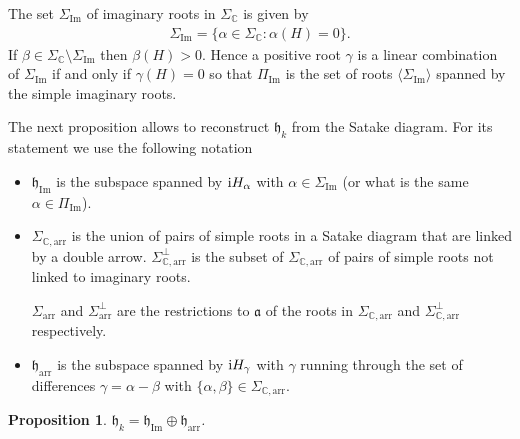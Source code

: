 \documentclass[10pt,a4paper]{amsart}
\numberwithin{equation}{section}
\newtheorem{Proposition}[Theorem]{Proposition}
 { \theoremstyle{definition}
\newtheorem{Definition}[Theorem]{Definition}
\newtheorem{Note}[Theorem]{Note}
\newtheorem{Example}[Theorem]{Example}
\newtheorem{Remark}[Theorem]{Remark} }
\newcommand{\func}[1]{\operatorname{#1}}
\begin{document}
The set $\Sigma _{\func{Im}}$ of imaginary roots in $\Sigma _{\mathbb{C}}$ is given by
\begin{gather*}
\Sigma _{\func{Im}}=\{\alpha \in \Sigma _{\mathbb{C}}\colon \alpha (H)=0\}.
\end{gather*}If $\beta \in \Sigma _{\mathbb{C}}\setminus \Sigma _{\func{Im}}$ then $\beta (H) >0$. Hence a positive root $\gamma $ is a linear combination of $\Sigma _{\func{Im}}$ if and only if $\gamma (H) =0$ so that $\Pi _{\func{Im}}$ is the set of roots $\langle \Sigma _{\func{Im}}\rangle $ spanned by the simple imaginary roots.

The next proposition allows to reconstruct $\mathfrak{h}_{k}$ from the Satake diagram. For its statement we use the following notation

\begin{itemize}\itemsep=0pt
\item $\mathfrak{h}_{\func{Im}}$ is the subspace spanned by ${\rm i}H_{\alpha }$ with $\alpha \in \Sigma _{\func{Im}}$ (or what is the same $\alpha \in \Pi _{\func{Im}}$).

\item $\Sigma _{\mathbb{C},\mathrm{arr}}$ is the union of pairs of simple roots in a Satake diagram that are linked by a double arrow. $\Sigma _{\mathbb{C},\mathrm{arr}}^{\bot }$ is the subset of $\Sigma _{\mathbb{C},\mathrm{arr}}$ of pairs of simple roots not linked to imaginary roots.

$\Sigma _{\mathrm{arr}}$ and $\Sigma _{\mathrm{arr}}^{\bot }$ are the restrictions to $\mathfrak{a}$ of the roots in $\Sigma _{\mathbb{C},\mathrm{arr}}$ and $\Sigma _{\mathbb{C},\mathrm{arr}}^{\bot }$ respectively.

\item $\mathfrak{h}_{\mathrm{arr}}$ is the subspace spanned by ${\rm i}H_{\gamma }$ with $\gamma $ running through the set of differences $\gamma =\alpha -\beta$ with $\{\alpha,\beta\} \in \Sigma _{\mathbb{C},\mathrm{arr}}$.
\end{itemize}

\begin{Proposition}\label{propHagak}$\mathfrak{h}_{k}=\mathfrak{h}_{\func{Im}}\oplus \mathfrak{h}_{\mathrm{arr}}$.
\end{Proposition}
\end{document}
